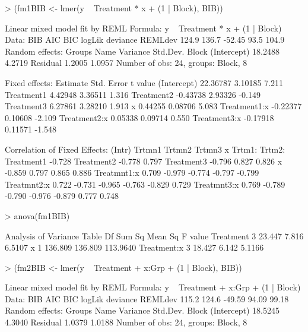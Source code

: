 \documentclass[12pt]{article}
\begin{document}
\begin{Schunk}
\begin{Sinput}
> (fm1BIB <- lmer(y ~ Treatment * x + (1 | Block), BIB))
\end{Sinput}
\begin{Soutput}
Linear mixed model fit by REML 
Formula: y ~ Treatment * x + (1 | Block) 
   Data: BIB 
   AIC   BIC logLik deviance REMLdev
 124.9 136.7 -52.45     93.5   104.9
Random effects:
 Groups   Name        Variance Std.Dev.
 Block    (Intercept) 18.2488  4.2719  
 Residual              1.2005  1.0957  
Number of obs: 24, groups: Block, 8

Fixed effects:
             Estimate Std. Error t value
(Intercept)  22.36787    3.10185   7.211
Treatment1    4.42948    3.36511   1.316
Treatment2   -0.43738    2.93326  -0.149
Treatment3    6.27861    3.28210   1.913
x             0.44255    0.08706   5.083
Treatment1:x -0.22377    0.10608  -2.109
Treatment2:x  0.05338    0.09714   0.550
Treatment3:x -0.17918    0.11571  -1.548

Correlation of Fixed Effects:
            (Intr) Trtmn1 Trtmn2 Trtmn3 x      Trtm1: Trtm2:
Treatment1  -0.728                                          
Treatment2  -0.778  0.797                                   
Treatment3  -0.796  0.827  0.826                            
x           -0.859  0.797  0.865  0.886                     
Treatmnt1:x  0.709 -0.979 -0.774 -0.797 -0.799              
Treatmnt2:x  0.722 -0.731 -0.965 -0.763 -0.829  0.729       
Treatmnt3:x  0.769 -0.789 -0.790 -0.976 -0.879  0.777  0.748
\end{Soutput}
\begin{Sinput}
> anova(fm1BIB)
\end{Sinput}
\begin{Soutput}
Analysis of Variance Table
            Df  Sum Sq Mean Sq  F value
Treatment    3  23.447   7.816   6.5107
x            1 136.809 136.809 113.9640
Treatment:x  3  18.427   6.142   5.1166
\end{Soutput}
\begin{Sinput}
> (fm2BIB <- lmer(y ~ Treatment + x:Grp + (1 | Block), BIB))
\end{Sinput}
\begin{Soutput}
Linear mixed model fit by REML 
Formula: y ~ Treatment + x:Grp + (1 | Block) 
   Data: BIB 
   AIC   BIC logLik deviance REMLdev
 115.2 124.6 -49.59    94.09   99.18
Random effects:
 Groups   Name        Variance Std.Dev.
 Block    (Intercept) 18.5245  4.3040  
 Residual              1.0379  1.0188  
Number of obs: 24, groups: Block, 8


\end{Soutput}
\end{Schunk}
\end{document}
